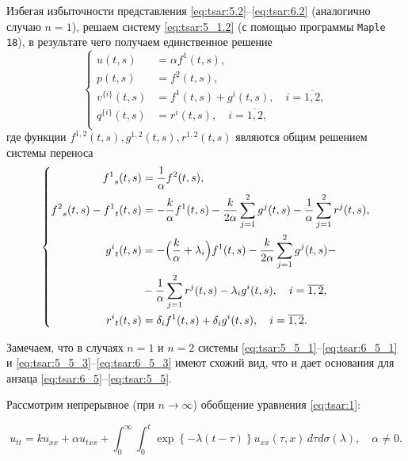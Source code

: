 Избегая избыточности представления \eqref{eq:tsar:5.2}--\eqref{eq:tsar:6.2} (аналогично случаю ${n=1}$), 
решаем систему \eqref{eq:tsar:5_1.2} (с помощью программы {\tt Maple 18}), в результате чего получаем 
единственное решение
\begin{equation}
\left\{
\begin{aligned}
u(t,s) &= \alpha {f^{1}}(t,s), \\
p(t,s) &= {f^{2}}(t,s),\\
v^{\{i\}}(t,s) &= {f^{1}}(t,s) + {g^{i}}(t,s), \quad i = \overline{ 1, 2 },\\
q^{\{i\}}(t,s) &= {r^{i}}(t,s), \quad i = \overline{ 1, 2 },\\
\end{aligned}
\right. \label{eq:tsar:5_5_3}
\end{equation}
где функции ${f^{1,2}}(t,s), g^{1,2}(t,s), r^{1,2}(t,s)$ являются общим решением системы переноса
\begin{equation}
\left\{
\begin{aligned}
{f^1}_s(t,s) &= \frac{1}{\alpha} {f^2}(t,s),\\
{f^2}_s(t,s) - {f^1}_t(t,s) &= - \frac{k}{\alpha} {f^1}(t,s)
							  - \frac{k}{2 \alpha} \sum_{j=1}^{2} {g^{j}}(t,s)
							  - \frac{1}{\alpha} \sum_{j=1}^{2} {r^{j}}(t,s), \\
{g^{i}}_t(t,s) &= -\Bigl( \frac{k}{\alpha} + \lambda_i \Bigr) {f^1}(t,s)
				- \frac{k}{2 \alpha} \sum_{j=1}^{2} {g^{j}}(t,s) -
\\&
				- \frac{1}{\alpha} \sum_{j=1}^{2} {r^{j}}(t,s)
				-\lambda_i {g^{i}}(t,s)
				, \quad i = \overline{ 1, 2 }
				,\\
{r^{i}}_t(t,s) &= \delta_i {f^1}(t,s)
				+ \delta_i {g^{i}}(t,s)
				, \quad i = \overline{ 1, 2 }
				.\\
\end{aligned}
\right. \label{eq:tsar:6_5_3}
\end{equation}

Замечаем, что в случаях $n=1$ и $n=2$ системы \eqref{eq:tsar:5_5_1}--\eqref{eq:tsar:6_5_1} и 
\eqref{eq:tsar:5_5_3}--\eqref{eq:tsar:6_5_3} имеют схожий вид, что и дает основания 
для анзаца \eqref{eq:tsar:6_5}--\eqref{eq:tsar:5_5}.

\smallskip

Рассмотрим непрерывное (при $n \to \infty$) обобщение уравнения \eqref{eq:tsar:1}: 

\begin{equation}
 u_{tt}=k u_{xx}+\alpha u_{txx}
+  \int_0^{\infty} \int^t_0 \exp \left\{ -\lambda (t-\tau) \right\} u_{xx}(\tau,x)\, d\tau d\sigma(\lambda), \quad \alpha \neq 0.
\label{eq:tsar:_1}
\end{equation}

